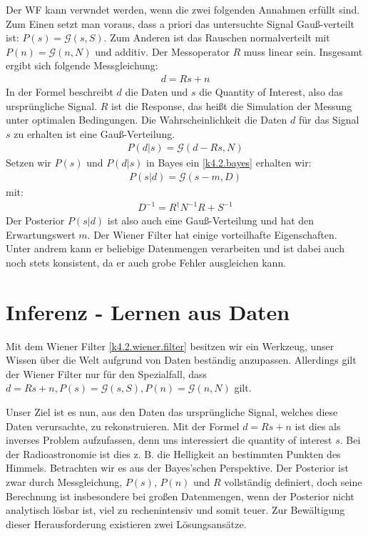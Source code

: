 \documentclass[]{dsadokumentation}
\begin{document}
Der WF kann verwndet werden, wenn die zwei folgenden Annahmen erfüllt sind. Zum Einen setzt man voraus, dass a priori das untersuchte Signal Gauß-verteilt ist: $P(s) = \mathcal{G}(s,S)$. Zum Anderen ist das Rauschen normalverteilt mit $P(n) = \mathcal{G}(n,N)$ und additiv. Der Messoperator $R$ muss linear sein. Insgesamt ergibt sich folgende Messgleichung:
\begin{eqnarray}
d = Rs + n
\end{eqnarray}
In der Formel beschreibt $d$ die Daten und $s$ die Quantity of Interest, also das ursprüngliche Signal. $R$ ist die Response, das heißt die Simulation der Messung unter optimalen Bedingungen. Die Wahrscheinlichkeit die Daten $d$ für das Signal $s$ zu erhalten ist eine Gauß-Verteilung.
\begin{eqnarray}
P(d|s) = \mathcal{G}(d-Rs,N)
\end{eqnarray}
Setzen wir $P(s)$ und $P(d|s)$ in Bayes ein \cref{k4.2.bayes} erhalten wir:
\begin{eqnarray}
P(s|d) = \mathcal{G}(s-m,D)
\end{eqnarray}
mit:
\begin{eqnarray}
D^{-1} = R^{\dagger} N^{-1}R + S^{-1}
\end{eqnarray}
Der Posterior $P(s|d)$ ist also auch eine Gauß-Verteilung und hat den Erwartungswert $m$. Der Wiener Filter hat einige vorteilhafte Eigenschaften. Unter andrem kann er beliebige Datenmengen verarbeiten und ist dabei auch noch stets konsistent, da er auch grobe Fehler ausgleichen kann.

\section{Inferenz - Lernen aus Daten}
Mit dem Wiener Filter \cref{k4.2.wiener.filter} besitzen wir ein Werkzeug, unser Wissen über die Welt aufgrund von Daten beständig anzupassen. Allerdings gilt der Wiener Filter nur für den Spezialfall, dass $d=Rs+n, P(s)=\mathcal{G}(s,S), P(n) = \mathcal{G}(n,N)$ gilt.

Unser Ziel ist es nun, aus den Daten das ursprüngliche Signal, welches diese Daten verursachte, zu rekonstruieren. Mit der Formel $d=Rs+n$ ist dies als inverses Problem aufzufassen, denn uns interessiert die quantity of interest $s$. Bei der Radioastronomie ist dies z. B. die Helligkeit an bestimmten Punkten des Himmels. Betrachten wir es aus der Bayes'schen Perspektive. Der Posterior ist zwar durch Messgleichung, $P(s)$, $P(n)$ und $R$ vollständig definiert, doch seine Berechnung ist insbesondere bei großen Datenmengen, wenn der Posterior nicht analytisch lösbar ist, viel zu rechenintensiv und somit teuer. Zur Bewältigung dieser Herausforderung existieren zwei Lösungsansätze.
\end{document}
